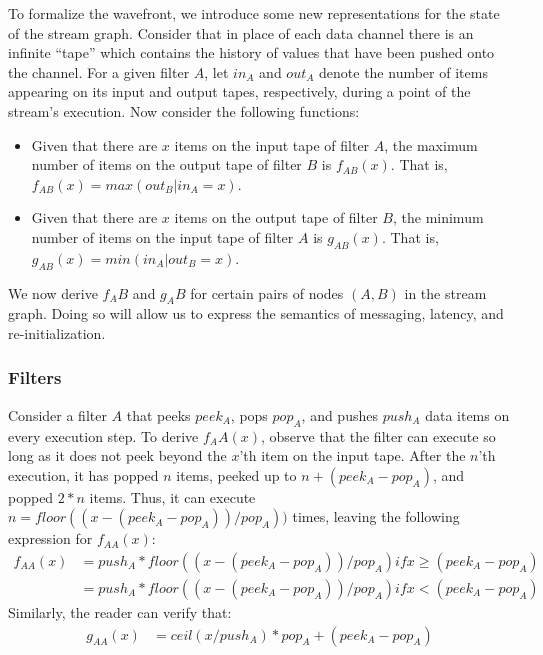 To formalize the wavefront, we introduce some new representations for
the state of the stream graph.  Consider that in place of each data
channel there is an infinite ``tape'' which contains the history of
values that have been pushed onto the channel.  For a given filter $A$,
let $in_A$ and $out_A$ denote the number of items appearing on its input
and output tapes, respectively, during a point of the stream's
execution.  Now consider the following functions:

\begin{itemize}

\item Given that there are $x$ items on the input tape of filter $A$,
the maximum number of items on the output tape of filter $B$ is
$f_{AB}(x)$.  That is, $f_{AB}(x) = max(out_B | in_A = x)$.

\item Given that there are $x$ items on the output tape of filter $B$,
the minimum number of items on the input tape of filter $A$ is
$g_{AB}(x)$.  That is, $g_{AB}(x) = min(in_A | out_B = x)$.

\end{itemize}

We now derive $f_AB$ and $g_AB$ for certain pairs of nodes $(A, B)$ in
the stream graph.  Doing so will allow us to express the semantics of
messaging, latency, and re-initialization.

\subsubsection{Filters}

Consider a filter $A$ that peeks $peek_A$, pops $pop_A$, and pushes
$push_A$ data items on every execution step.  To derive $f_AA(x)$,
observe that the filter can execute so long as it does not peek beyond
the $x$'th item on the input tape.  After the $n$'th execution, it has
popped $n$ items, peeked up to $n + (peek_A - pop_A)$, and popped $2 *
n$ items.  Thus, it can execute $n = floor((x - (peek_A - pop_A)) /
pop_A))$ times, leaving the following expression for $f_{AA}(x)$:
\begin{eqnarray*}
f_{AA}(x)&= push_A*floor((x-(peek_A-pop_A))/pop_A) if x \ge (peek_A-pop_A) \\
         &= push_A*floor((x-(peek_A-pop_A))/pop_A) if x <  (peek_A-pop_A)
\end{eqnarray*}
Similarly, the reader can verify that:
\begin{eqnarray*}
g_{AA}(x)&= ceil(x/push_A)*pop_A+(peek_A-pop_A)
\end{eqnarray*}

